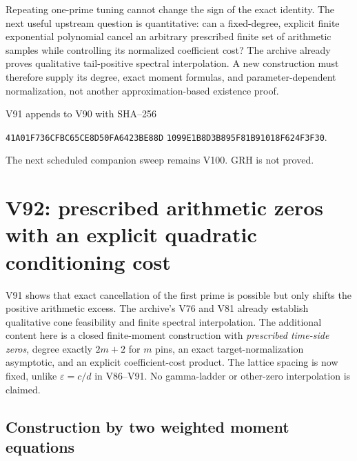 \documentclass[11pt]{article}
\theoremstyle{definition}
\theoremstyle{remark}
\begin{document}
Repeating one-prime tuning cannot change the sign of the exact identity.
The next useful upstream question is quantitative: can a fixed-degree,
explicit finite exponential polynomial cancel an arbitrary prescribed
finite set of arithmetic samples while controlling its normalized
coefficient cost?  The archive already proves qualitative tail-positive
spectral interpolation.  A new construction must therefore supply its
degree, exact moment formulas, and parameter-dependent normalization,
not another approximation-based existence proof.

V91 appends to V90 with SHA--256
\begin{center}
\texttt{41A01F736CFBC65CE8D50FA6423BE88D}\allowbreak
\texttt{1099E1B8D3B895F81B91018F624F3F30}.
\end{center}
The next scheduled companion sweep remains V100.  GRH is not proved.
\endgroup

\clearpage
\section{V92: prescribed arithmetic zeros with an explicit quadratic conditioning cost}
\label{sec:f2v92-finite-pins}
\begingroup
\setcounter{equation}{0}
\renewcommand{\theequation}{N92.\arabic{equation}}
\renewcommand{\theHequation}{f2v92.\arabic{equation}}

V91 shows that exact cancellation of the first prime is possible but
only shifts the positive arithmetic excess.  The archive's V76 and V81
already establish qualitative cone feasibility and finite spectral
interpolation.  The additional content here is a closed finite-moment
construction with \emph{prescribed time-side zeros}, degree exactly
\(2m+2\) for \(m\) pins, an exact target-normalization asymptotic,
and an explicit coefficient-cost product.  The lattice spacing is now
fixed, unlike \(\varepsilon=c/d\) in V86--V91.  No gamma-ladder or
other-zero interpolation is claimed.

\subsection{Construction by two weighted moment equations}
\end{document}
